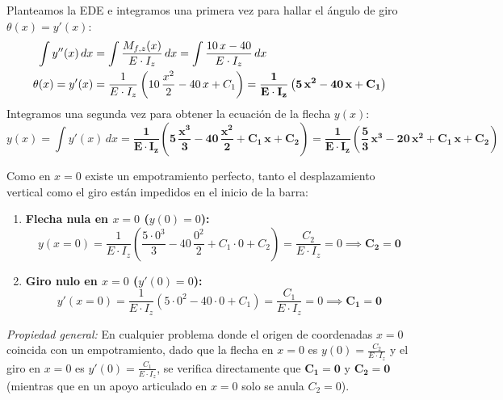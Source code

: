 {    

    Planteamos la EDE e integramos una primera vez para hallar el ángulo de giro $\theta(x) = y'(x)$:
    \begin{align}
        \int y''(x) \, dx & = \int \frac{M_{f,z}(x)}{E \cdot I_z} \, dx = \int \frac{10\,x - 40}{E \cdot I_z} \, dx \notag                                              \\
        \theta(x) = y'(x) & = \frac{1}{E \cdot I_z} \left( 10\,\frac{x^2}{2} - 40\,x + C_1 \right) = \mathbf{\frac{1}{E \cdot I_z} \left( 5\,x^2 - 40\,x + C_1 \right)}
    \end{align}
    Integramos una segunda vez para obtener la ecuación de la flecha $y(x)$:
    \begin{equation}
        y(x) = \int y'(x) \, dx = \mathbf{\frac{1}{E \cdot I_z} \left( 5\,\frac{x^3}{3} - 40\,\frac{x^2}{2} + C_1\,x + C_2 \right) = \frac{1}{E \cdot I_z} \left( \frac{5}{3}\,x^3 - 20\,x^2 + C_1\,x + C_2 \right)}
    \end{equation}


    Como en $x = 0$ existe un empotramiento perfecto, tanto el desplazamiento vertical como el giro están impedidos en el inicio de la barra:
    \begin{enumerate}
        \item \textbf{Flecha nula en $x = 0$ ($y(0) = 0$):}
              \begin{equation}
                  y(x = 0) = \frac{1}{E \cdot I_z} \left( \frac{5 \cdot 0^3}{3} - 40\,\frac{0^2}{2} + C_1 \cdot 0 + C_2 \right) = \frac{C_2}{E \cdot I_z} = 0 \implies \mathbf{C_2 = 0}
              \end{equation}
        \item \textbf{Giro nulo en $x = 0$ ($y'(0) = 0$):}
              \begin{equation}
                  y'(x = 0) = \frac{1}{E \cdot I_z} \left( 5 \cdot 0^2 - 40 \cdot 0 + C_1 \right) = \frac{C_1}{E \cdot I_z} = 0 \implies \mathbf{C_1 = 0}
              \end{equation}
    \end{enumerate}
    \textit{Propiedad general:} En cualquier problema donde el origen de coordenadas $x = 0$ coincida con un empotramiento, dado que la flecha en $x = 0$ es $y(0) = \frac{C_2}{E \cdot I_z}$ y el giro en $x = 0$ es $y'(0) = \frac{C_1}{E \cdot I_z}$, se verifica directamente que $\mathbf{C_1 = 0}$ y $\mathbf{C_2 = 0}$ (mientras que en un apoyo articulado en $x = 0$ solo se anula $C_2 = 0$).

}

